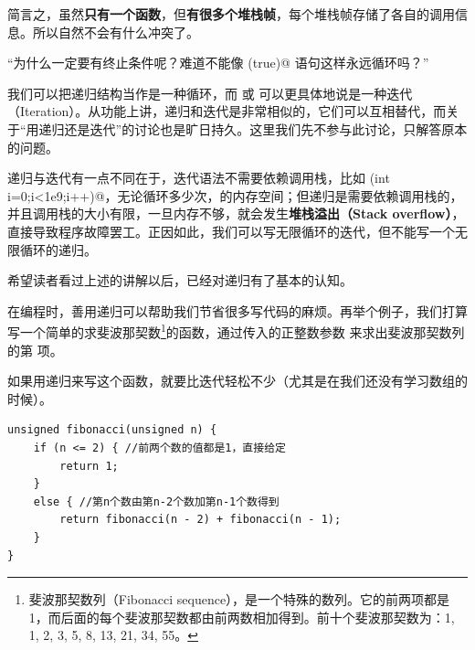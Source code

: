 简言之，虽然\textbf{只有一个函数}，但\textbf{有很多个堆栈帧}，每个堆栈帧存储了各自的调用信息。所以自然不会有什么冲突了。\par
{\kaishu ``为什么一定要有终止条件呢？难道不能像 \lstinline@while(true)@ 语句这样永远循环吗？''}\par
我们可以把递归结构当作是一种循环，而 \lstinline@for@ 或 \lstinline@while@ 可以更具体地说是一种迭代（Iteration）。从功能上讲，递归和迭代是非常相似的，它们可以互相替代，而关于``用递归还是迭代''的讨论也是旷日持久。这里我们先不参与此讨论，只解答原本的问题。\par
递归与迭代有一点不同在于，迭代语法不需要依赖调用栈，比如 \lstinline@for(int i=0;i<1e9;i++)@，无论循环多少次， \lstinline@int@ 的内存空间；但递归是需要依赖调用栈的，并且调用栈的大小有限，一旦内存不够，就会发生\textbf{堆栈溢出（Stack overflow）}，直接导致程序故障罢工。正因如此，我们可以写无限循环的迭代，但不能写一个无限循环的递归。\par
希望读者看过上述的讲解以后，已经对递归有了基本的认知。\par
在编程时，善用递归可以帮助我们节省很多写代码的麻烦。再举个例子，我们打算写一个简单的求斐波那契数\footnote{斐波那契数列（Fibonacci sequence），是一个特殊的数列。它的前两项都是1，而后面的每个斐波那契数都由前两数相加得到。前十个斐波那契数为：1, 1, 2, 3, 5, 8, 13, 21, 34, 55。}的函数，通过传入的正整数参数 \lstinline@n@ 来求出斐波那契数列的第 \lstinline@n@ 项。\par
如果用递归来写这个函数，就要比迭代轻松不少（尤其是在我们还没有学习数组的时候）。\par
\begin{lstlisting}
unsigned fibonacci(unsigned n) {
    if (n <= 2) { //前两个数的值都是1，直接给定
        return 1;
    }
    else { //第n个数由第n-2个数加第n-1个数得到
        return fibonacci(n - 2) + fibonacci(n - 1);
    }
}
\end{lstlisting}\par
